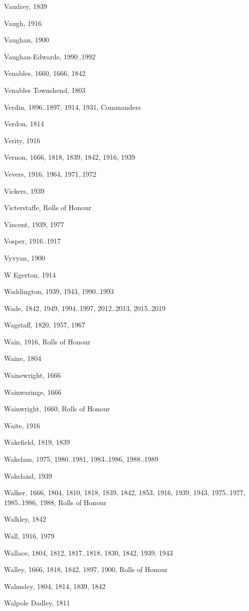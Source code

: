 \begin{theindex}
\item Vaudrey, 1839
\item Vaugh, 1916
\item Vaughan, 1900
\item Vaughan-Edwards, 1990..1992
\item Venables, 1660, 1666, 1842
\item Venables Townshend, 1803
\item Verdin, 1896..1897, 1914, 1931, Commanders
\item Verdon, 1814
\item Verity, 1916
\item Vernon, 1666, 1818, 1839, 1842, 1916, 1939
\item Vevers, 1916, 1964, 1971..1972
\item Vickers, 1939
\item Victerstaffe, Rolls of Honour
\item Vincent, 1939, 1977
\item Vosper, 1916..1917
\item Vyvyan, 1900
\item W Egerton, 1914
\item Waddington, 1939, 1943, 1990..1993
\item Wade, 1842, 1949, 1994..1997, 2012..2013, 2015..2019
\item Wagstaff, 1820, 1957, 1967
\item Wain, 1916, Rolls of Honour
\item Waine, 1804
\item Wainewright, 1666
\item Wainwaringe, 1666
\item Wainwright, 1660, Rolls of Honour
\item Waite, 1916
\item Wakefield, 1819, 1839
\item Wakelam, 1975, 1980..1981, 1983..1986, 1988..1989
\item Wakeland, 1939
\item Walker, 1666, 1804, 1810, 1818, 1839, 1842, 1853, 1916, 1939, 1943, 1975..1977, 1985..1986, 1988, Rolls of Honour
\item Walkley, 1842
\item Wall, 1916, 1979
\item Wallace, 1804, 1812, 1817..1818, 1830, 1842, 1939, 1943
\item Walley, 1666, 1818, 1842, 1897, 1900, Rolls of Honour
\item Walmsley, 1804, 1814, 1839, 1842
\item Walpole Dadley, 1811

\end{theindex}
